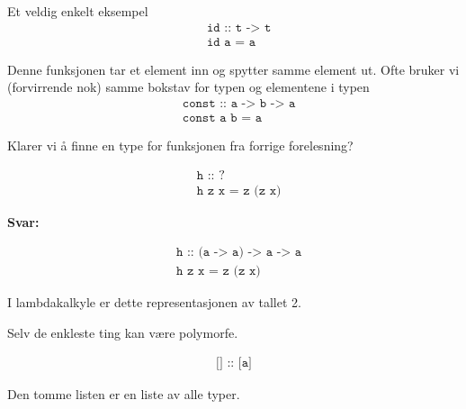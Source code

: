 \documentclass{article}
\begin{document}
\begin{eg}
    Et veldig enkelt eksempel
    \begin{align*}
        &\texttt{id :: t -> t} \\
        & \texttt{id a = a}
    \end{align*}

    Denne funksjonen tar et element inn og spytter samme element ut. Ofte bruker vi (forvirrende nok) samme bokstav for typen og elementene i typen
    \begin{align*}
        &\texttt{const :: a -> b -> a} \\
        & \texttt{const a b = a}
    \end{align*}
\end{eg}

\begin{eg}
    Klarer vi å finne en type for funksjonen fra forrige forelesning?

    \begin{align*}
        & \texttt{h :: ?} \\
        & \texttt{h z x = z (z x)}
    \end{align*}

    \textbf{Svar:}

    \begin{align*}
        &\texttt{h :: (a -> a) -> a -> a} \\
        & \texttt{h z x = z (z x)}
    \end{align*}

    I lambdakalkyle er dette representasjonen av tallet 2.
\end{eg}


\begin{eg}
    Selv de enkleste ting kan være polymorfe.

    \begin{align*}
    \texttt{[] :: [a]}
    \end{align*}

    Den tomme listen er en liste av alle typer.
\end{eg}
\end{document}
